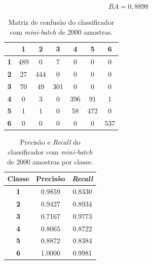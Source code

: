 \begin{equation}\label{eq:ba_lr_2000}
BA = 0,8898
\end{equation}

\begin{table}[H]
\centering
\begin{tabular}{c|c|c|c|c|c|c|}
	\cline{2-7}
	& \textbf{1} & \textbf{2} & \textbf{3} & \textbf{4} & \textbf{5} & \textbf{6} \\ \hline\hline
	\multicolumn{1}{|c||}{\textbf{1}} & 489        & 0          & 7          & 0          & 0          & 0          \\ \hline
	\multicolumn{1}{|c||}{\textbf{2}} & 27         & 444        & 0          & 0          & 0          & 0          \\ \hline
	\multicolumn{1}{|c||}{\textbf{3}} & 70         & 49         & 301        & 0          & 0          & 0          \\ \hline
	\multicolumn{1}{|c||}{\textbf{4}} & 0          & 3          & 0          & 396        & 91         & 1          \\ \hline
	\multicolumn{1}{|c||}{\textbf{5}} & 1          & 1          & 0          & 58         & 472        & 0          \\ \hline
	\multicolumn{1}{|c||}{\textbf{6}} & 0          & 0          & 0          & 0          & 0          & 537        \\ \hline
\end{tabular}
\caption{Matriz de confusão do classificador com \textit{mini-batch} de 2000 amostras.}
\label{tab:mc_lr_2000}
\end{table}

\begin{table}[H]
\centering
\begin{tabular}{c|c|c}
	\textbf{Classe} & \textbf{Precisão} & \textit{\textbf{Recall}} \\ \hline
	\textbf{1}      & 0.9859            & 0.8330                   \\
	\textbf{2}      & 0.9427            & 0.8934                   \\
	\textbf{3}      & 0.7167            & 0.9773                   \\
	\textbf{4}      & 0.8065            & 0.8722                   \\
	\textbf{5}      & 0.8872            & 0.8384                   \\
	\textbf{6}      & 1.0000            & 0.9981                  
\end{tabular}
\caption{Precisão e \textit{Recall} do classificador com \textit{mini-batch} de 2000 amostras por classe.}
\label{tab:pr_lr_2000}
\end{table}

